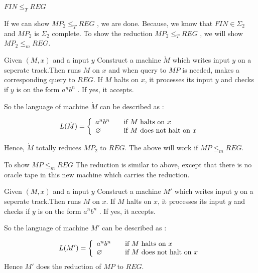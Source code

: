\documentclass[addpoints,12pt]{exam}
\begin{document}
\begin{questions}
 
 
 \question
 
 $FIN\leq_{T}REG$ \newline
 
  If we can show $MP_{2}\leq_{T}REG$ , we are done. Because, we know that $FIN\in\Sigma_{2}$ and $MP_{2}$ is $\Sigma_{2}$ complete.
  To show the reduction $MP_{2}\leq_{T}REG$ , we will show $MP_{2}\leq_{m}REG$. \newline
    
  Given $(M,x)$ and a input $y$
  Construct a machine $\grave M$ which writes input $y$ on a seperate track.Then runs $M$ on $x$ and when query to $MP$ is needed, makes a corresponding query to $REG$. If $M$ halts on $x$, it processes its input $y$ and checks if
  $y$ is on the form $a^{n}b^{n}$ . If yes, it accepts. \newline
  
  So the language of machine $\grave M$ can be described as : 
  
	\[
	  L(\grave M) = \left\{ 
	\begin{array}{l l}
	  a^{n}b^{n} & \quad \text{if $M$ halts on $x$}\\
	  \varnothing & \quad \text{if $M$ does not halt on $x$}\\
	\end{array} \right.
      \]
  
    Hence, $\grave M$ totally reduces $MP_{2}$ to $REG$. The above will work if $MP\leq_{m}REG$. \newline
    
    To show $MP\leq_{m}REG$ \newline
      The reduction is similar to above, except that there is no oracle tape in this new machine which carries the reduction. \newline
      
    Given $(M,x)$ and a input $y$
    Construct a machine $M'$ which writes input $y$ on a seperate track.Then runs $M$ on $x$. If $M$ halts on $x$, it processes its input $y$ and checks if
  $y$ is on the form $a^{n}b^{n}$ . If yes, it accepts. \newline
  
  So the language of machine $M'$ can be described as : 
  
	\[
	  L(M') = \left\{ 
	\begin{array}{l l}
	  a^{n}b^{n} & \quad \text{if $M$ halts on $x$}\\
	  \varnothing & \quad \text{if $M$ does not halt on $x$}\\
	\end{array} \right.
      \]
    Hence $M'$ does the reduction of $MP$ to $REG$.
 \end{questions}
\end{document}
